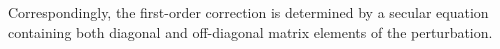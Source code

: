 Correspondingly, the first-order correction is determined by a secular equation containing both diagonal and off-diagonal matrix elements of the perturbation.
